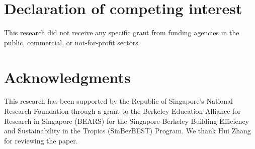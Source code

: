\section{Declaration of competing interest}\label{sec:declaration-of-competing-interest}
This research did not receive any specific grant from funding agencies in the public, commercial, or not-for-profit sectors.

\section{Acknowledgments}\label{sec:acknowledgments}
This research has been supported by the Republic of Singapore's National Research Foundation through a grant to the Berkeley Education Alliance for Research in Singapore (BEARS) for the Singapore-Berkeley Building Efficiency and Sustainability in the Tropics (SinBerBEST) Program.
We thank Hui Zhang for reviewing the paper.